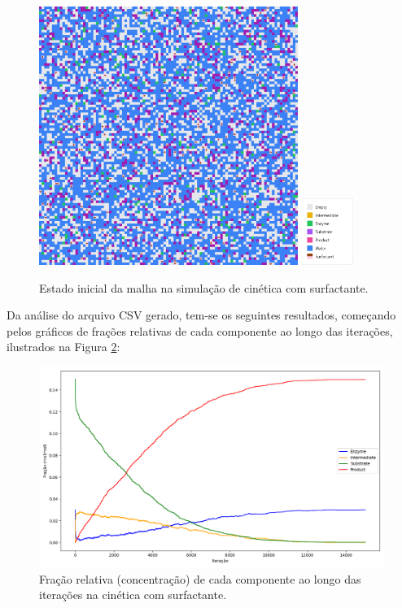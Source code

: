 \documentclass[12pt,oneside]{report}
\begin{document}
\begin{figure}[H]
    \centering
    \includegraphics[width=0.75\textwidth]{img/MM_surf_initial.png}
    \hspace{0.05\textwidth}
    \includegraphics[width=0.15\textwidth]{img/legend_surf.png}
    \caption{\small Estado inicial da malha na simulação de cinética com surfactante.}
    \label{fig:MM_surf_initial}
\end{figure}

Da análise do arquivo CSV gerado, tem-se os seguintes resultados, começando pelos gráficos de frações relativas de cada componente ao longo das iterações, ilustrados na Figura \ref{fig:MM_surf_conc}:

\begin{figure}[H]
    \centering
    \includegraphics[width=1\textwidth]{img/MM_surf_conc.png}
    \caption{\small Fração relativa (concentração) de cada componente ao longo das iterações na cinética com surfactante.}
    \label{fig:MM_surf_conc}
\end{figure}
\end{document}
